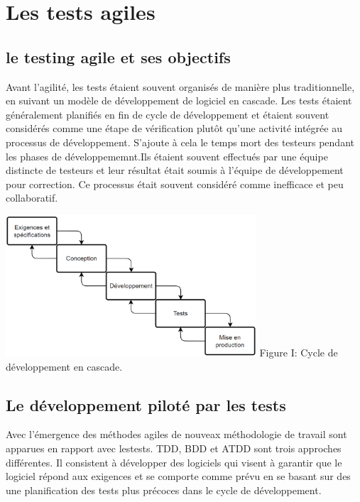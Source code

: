 \chapter{Les tests agiles}
\thispagestyle{fancy}
\section{ le testing agile et ses objectifs}
\label{sec:agiletest}
Avant l'agilité, les tests étaient souvent organisés de manière plus traditionnelle, en suivant un modèle de développement de logiciel en cascade. Les tests étaient généralement planifiés en fin de cycle de développement et étaient souvent considérés comme une étape de vérification plutôt qu'une activité intégrée au processus de développement. S'ajoute à cela le temps mort des testeurs pendant les phases de développememnt.Ils étaient souvent effectués par une équipe distincte de testeurs et leur résultat était soumis à l'équipe de développement pour correction. Ce processus était souvent considéré comme inefficace et peu collaboratif.
\begin{center}
    \includegraphics[width=0.7\textwidth]{incremental.png}
    \linebreak
    Figure I: Cycle de développement en cascade. 

    
\end{center}

\section{Le développement piloté par les tests}
Avec l'émergence des méthodes agiles de nouveax méthodologie de travail sont apparues en rapport avec lestests.
TDD, BDD et ATDD sont trois approches différentes. Il consistent à développer des logiciels qui visent à garantir que le logiciel répond aux exigences et se comporte comme prévu en se basant sur des une planification des tests plus précoces dans le cycle de développement.

